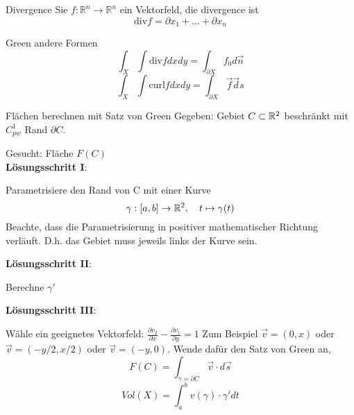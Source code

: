 \begin{Definition}{Divergence}{}
	Sie $f: \mathbb{R}^n \rightarrow \mathbb{R}^n$ ein Vektorfeld, die divergence ist
	\[
		\text{div} f = \partial x_1 + ... + \partial x_n
	\]
\end{Definition}

\begin{Satz}{Green andere Formen}{}
	\[
	\int_X \int	\text{div} f dx dy = \int_{\partial X} f_0 d\vec n
	\]
	\[
		\int_X \int	\text{curl} f dx dy = \int_{\partial X} \vec f \vec ds
	\]
\end{Satz}

\begin{Rezept}[label=GreenFlaechen]{Flächen berechnen mit Satz von Green}{}
	Gegeben: Gebiet $C \subset \mathbb{R}^2$ beschränkt mit $C^1_{pw}$ Rand $\partial C$.
	
	Gesucht: Fläche $F(C)$\\
	
	\textbf{Lösungsschritt I}:
	
	Parametrisiere den Rand von C mit einer Kurve
	\[
  		\gamma:[a, b] \to \mathbb{R}^2,\quad t \mapsto \gamma(t)
	\]
	Beachte, dass die Parametrisierung in positiver mathematischer Richtung verläuft. D.h. das Gebiet muss jeweils links der Kurve sein.
	
	\textbf{Lösungsschritt II}:
	
	Berechne $\gamma'$

	\textbf{Lösungsschritt III}:
	
	Wähle ein geeignetes Vektorfeld:
	$\frac{\partial v_2}{\partial x} -\frac{\partial v_1}{\partial y} = 1$ 
	Zum Beispiel $\vec v = (0, x)$ oder $\vec v = (-y/2, x/2)$ oder $\vec v = (-y, 0)$.
	Wende dafür den Satz von Green an,
	\[
  		F(C) =
  		\int_{\gamma=\partial C} \vec{v} \cdot d\vec{s}
	\]
	\[
		Vol(X) = \int_a^b v(\gamma) \cdot \gamma' dt	
	\]
\end{Rezept}


